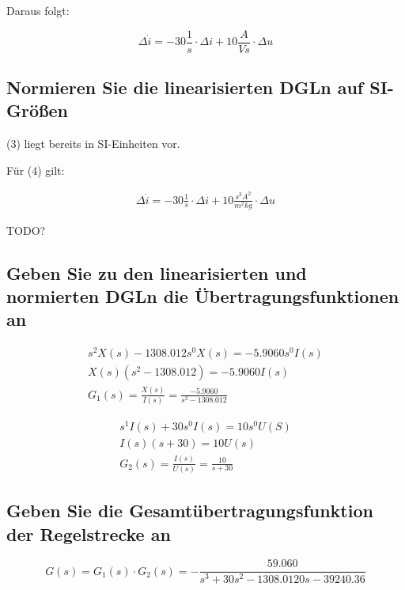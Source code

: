 \documentclass[a4paper,10pt,left=1.5cm,right=1.5cm,top=1.5cm,bottom=1.5cm]{article}
\begin{document}
Daraus folgt:

\begin{equation}
  \Delta \dot{i} = -30 \frac{1}{s} \cdot \Delta i + 10 \frac{A}{Vs} \cdot \Delta u
\end{equation}

\subsection{Normieren Sie die linearisierten DGLn auf SI-Größen}

(3) liegt bereits in SI-Einheiten vor.

Für (4) gilt:

\begin{eqnarray}
  \Delta \dot{i} = -30 \frac{1}{s} \cdot \Delta i + 10 \frac{s^2 A^2}{m^2 kg} \cdot \Delta u
\end{eqnarray}

TODO?

\subsection{Geben Sie zu den linearisierten und normierten DGLn die Übertragungsfunktionen an}

\begin{eqnarray*}
  s^2 X(s) - 1308.012 s^0 X(s) = -5.9060 s^0 I(s) \\
  X(s)(s^2 - 1308.012) = -5.9060 I(s) \\
  G_1(s) = \frac{X(s)}{I(s)} = \frac{-5.9060}{s^2 - 1308.012}
\end{eqnarray*}

\begin{eqnarray*}
  s^1 I(s) + 30 s^0 I(s) = 10 s^0 U(S) \\
  I(s)(s + 30) = 10 U(s) \\
  G_2(s) = \frac{I(s)}{U(s)} = \frac{10}{s + 30} 
\end{eqnarray*}

\subsection{Geben Sie die Gesamtübertragungsfunktion der Regelstrecke an}

\begin{equation}
  G(s) = G_1(s) \cdot G_2(s) = - \frac{59.060}{s^3 + 30 s^2 - 1308.0120 s - 39240.36}
\end{equation}
\end{document}
